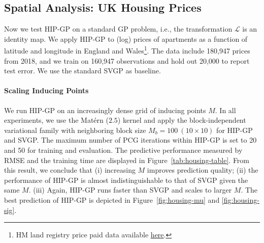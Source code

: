 \subsection{Spatial Analysis: UK Housing Prices}
Now we test HIP-GP on a standard GP problem,
i.e., the transformation $\mathcal{L}$ is an identity map.
We apply HIP-GP to (log) prices of apartments as a function of latitude and
longitude in England and Wales\footnote{HM land registry price paid data
available
\href{https://ckan.publishing.service.gov.uk/dataset/land-registry-monthly-price-paid-data}
{here}.}.  The data include 180{,}947 prices from 2018, and we train on
160{,}947 observations and hold out 20{,}000 to report test error.
We use the standard SVGP as baseline.


\paragraph{Scaling Inducing Points}
We run HIP-GP on an increasingly dense grid of inducing points $M$.
In all experiments, we use the Matérn ($2.5$) kernel
 and apply the block-independent variational family with
neighboring block size $M_b = 100~(10\times10)$  for HIP-GP and SVGP.
The maximum number of PCG iterations within HIP-GP is set to 20 and 50
for training and evaluation.
The predictive performance measured by RMSE and the training time are 
displayed in Figure~\ref{tab:housing-table}.
From this result, we conclude that
(i) increasing $M$ improves prediction quality;
(ii) the performance of HIP-GP is almost indistinguishable to that of
SVGP given the same $M$. (iii) Again, HIP-GP runs faster than SVGP and scales to larger $M$. 
The best prediction of HIP-GP is
depicted in Figure~\ref{fig:housing-mu} and \ref{fig:housing-sig}.


